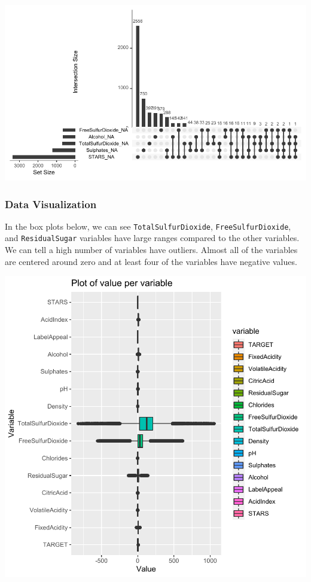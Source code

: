 \documentclass[]{elsarticle} %
\begin{document}
\begin{center}\includegraphics{paper_files/figure-latex/unnamed-chunk-5-1} \end{center}

\newpage

\hypertarget{data-visualization}{%
\subsubsection{Data Visualization}\label{data-visualization}}

In the box plots below, we can see \texttt{TotalSulfurDioxide},
\texttt{FreeSulfurDioxide}, and \texttt{ResidualSugar} variables have
large ranges compared to the other variables. We can tell a high number
of variables have outliers. Almost all of the variables are centered
around zero and at least four of the variables have negative values.

\begin{center}\includegraphics{paper_files/figure-latex/unnamed-chunk-6-1} \end{center}
\end{document}
